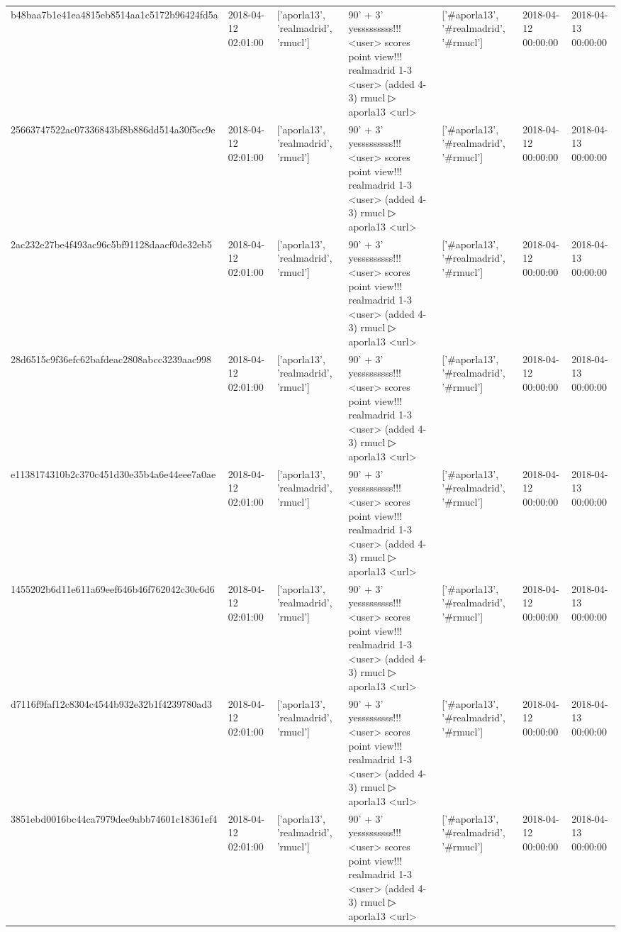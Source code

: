 \begin{tabular}{lllllll}
b48baa7b1e41ea4815eb8514aa1c5172b96424fd5a & 2018-04-12 02:01:00 & ['aporla13', 'realmadrid', 'rmucl'] & 90' + 3' yesssssssss!!! <user> scores point view!!! realmadrid 1-3 <user> (added 4-3) rmucl ▷ aporla13 <url> & ['#aporla13', '#realmadrid', '#rmucl'] & 2018-04-12 00:00:00 & 2018-04-13 00:00:00 \\
25663747522ac07336843bf8b886dd514a30f5cc9e & 2018-04-12 02:01:00 & ['aporla13', 'realmadrid', 'rmucl'] & 90' + 3' yesssssssss!!! <user> scores point view!!! realmadrid 1-3 <user> (added 4-3) rmucl ▷ aporla13 <url> & ['#aporla13', '#realmadrid', '#rmucl'] & 2018-04-12 00:00:00 & 2018-04-13 00:00:00 \\
2ac232e27be4f493ac96c5bf91128daacf0de32eb5 & 2018-04-12 02:01:00 & ['aporla13', 'realmadrid', 'rmucl'] & 90' + 3' yesssssssss!!! <user> scores point view!!! realmadrid 1-3 <user> (added 4-3) rmucl ▷ aporla13 <url> & ['#aporla13', '#realmadrid', '#rmucl'] & 2018-04-12 00:00:00 & 2018-04-13 00:00:00 \\
28d6515c9f36efc62bafdeac2808abcc3239aac998 & 2018-04-12 02:01:00 & ['aporla13', 'realmadrid', 'rmucl'] & 90' + 3' yesssssssss!!! <user> scores point view!!! realmadrid 1-3 <user> (added 4-3) rmucl ▷ aporla13 <url> & ['#aporla13', '#realmadrid', '#rmucl'] & 2018-04-12 00:00:00 & 2018-04-13 00:00:00 \\
e1138174310b2c370c451d30e35b4a6e44eee7a0ae & 2018-04-12 02:01:00 & ['aporla13', 'realmadrid', 'rmucl'] & 90' + 3' yesssssssss!!! <user> scores point view!!! realmadrid 1-3 <user> (added 4-3) rmucl ▷ aporla13 <url> & ['#aporla13', '#realmadrid', '#rmucl'] & 2018-04-12 00:00:00 & 2018-04-13 00:00:00 \\
1455202b6d11e611a69eef646b46f762042c30c6d6 & 2018-04-12 02:01:00 & ['aporla13', 'realmadrid', 'rmucl'] & 90' + 3' yesssssssss!!! <user> scores point view!!! realmadrid 1-3 <user> (added 4-3) rmucl ▷ aporla13 <url> & ['#aporla13', '#realmadrid', '#rmucl'] & 2018-04-12 00:00:00 & 2018-04-13 00:00:00 \\
d7116f9faf12c8304c4544b932e32b1f4239780ad3 & 2018-04-12 02:01:00 & ['aporla13', 'realmadrid', 'rmucl'] & 90' + 3' yesssssssss!!! <user> scores point view!!! realmadrid 1-3 <user> (added 4-3) rmucl ▷ aporla13 <url> & ['#aporla13', '#realmadrid', '#rmucl'] & 2018-04-12 00:00:00 & 2018-04-13 00:00:00 \\
3851ebd0016bc44ca7979dee9abb74601c18361ef4 & 2018-04-12 02:01:00 & ['aporla13', 'realmadrid', 'rmucl'] & 90' + 3' yesssssssss!!! <user> scores point view!!! realmadrid 1-3 <user> (added 4-3) rmucl ▷ aporla13 <url> & ['#aporla13', '#realmadrid', '#rmucl'] & 2018-04-12 00:00:00 & 2018-04-13 00:00:00 \\

\end{tabular}
